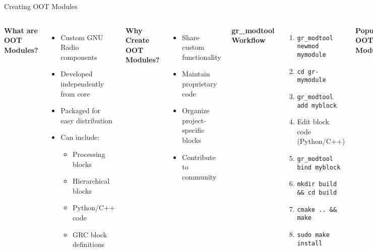 \documentclass[aspectratio=169,11pt]{beamer}
\begin{document}
\begin{frame}{Creating OOT Modules}
\begin{columns}[T]
\textbf{What are OOT Modules?}
\begin{itemize}
\small
    \item Custom GNU Radio components
    \item Developed independently from core
    \item Packaged for easy distribution
    \item Can include:
    \begin{itemize}
    \footnotesize
        \item Processing blocks
        \item Hierarchical blocks
        \item Python/C++ code
        \item GRC block definitions
    \end{itemize}
\end{itemize}

\textbf{Why Create OOT Modules?}
\begin{itemize}
\small
    \item Share custom functionality
    \item Maintain proprietary code
    \item Organize project-specific blocks
    \item Contribute to community
\end{itemize}

\textbf{gr\_modtool Workflow}
\begin{enumerate}
\small
    \item \texttt{gr\_modtool newmod mymodule}
    \item \texttt{cd gr-mymodule}
    \item \texttt{gr\_modtool add myblock}
    \item Edit block code (Python/C++)
    \item \texttt{gr\_modtool bind myblock}
    \item \texttt{mkdir build \&\& cd build}
    \item \texttt{cmake .. \&\& make}
    \item \texttt{sudo make install}
\end{enumerate}

\textbf{Popular OOT Modules}
\begin{itemize}
\small
    \item \textbf{gr-ieee802-11}: WiFi implementation
    \item \textbf{gr-lora}: LoRa transceiver
    \item \textbf{gr-satellites}: Satellite decoders
    \item \textbf{gr-fosphor}: GPU spectrum display
    \item \textbf{gr-osmosdr}: Hardware abstraction
\end{itemize}
\end{columns}
\end{frame}
\end{document}
